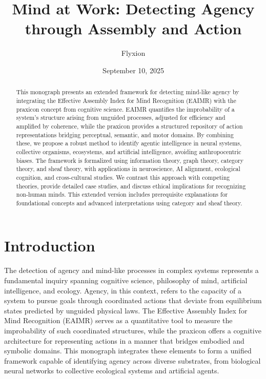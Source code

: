 \documentclass{article}
\title{Mind at Work: Detecting Agency through Assembly and Action}
\author{Flyxion}
\date{September 10, 2025}
\begin{document}
\maketitle

\begin{abstract}
This monograph presents an extended framework for detecting mind-like agency by integrating the Effective Assembly Index for Mind Recognition (EAIMR) with the praxicon concept from cognitive science. EAIMR quantifies the improbability of a system’s structure arising from unguided processes, adjusted for efficiency and amplified by coherence, while the praxicon provides a structured repository of action representations bridging perceptual, semantic, and motor domains. By combining these, we propose a robust method to identify agentic intelligence in neural systems, collective organisms, ecosystems, and artificial intelligence, avoiding anthropocentric biases. The framework is formalized using information theory, graph theory, category theory, and sheaf theory, with applications in neuroscience, AI alignment, ecological cognition, and cross-cultural studies. We contrast this approach with competing theories, provide detailed case studies, and discuss ethical implications for recognizing non-human minds. This extended version includes prerequisite explanations for foundational concepts and advanced interpretations using category and sheaf theory.
\end{abstract}

\section{Introduction}
\label{sec:introduction}

The detection of agency and mind-like processes in complex systems represents a fundamental inquiry spanning cognitive science, philosophy of mind, artificial intelligence, and ecology. Agency, in this context, refers to the capacity of a system to pursue goals through coordinated actions that deviate from equilibrium states predicted by unguided physical laws. The Effective Assembly Index for Mind Recognition (EAIMR) serves as a quantitative tool to measure the improbability of such coordinated structures, while the praxicon offers a cognitive architecture for representing actions in a manner that bridges embodied and symbolic domains. This monograph integrates these elements to form a unified framework capable of identifying agency across diverse substrates, from biological neural networks to collective ecological systems and artificial agents.
\end{document}

